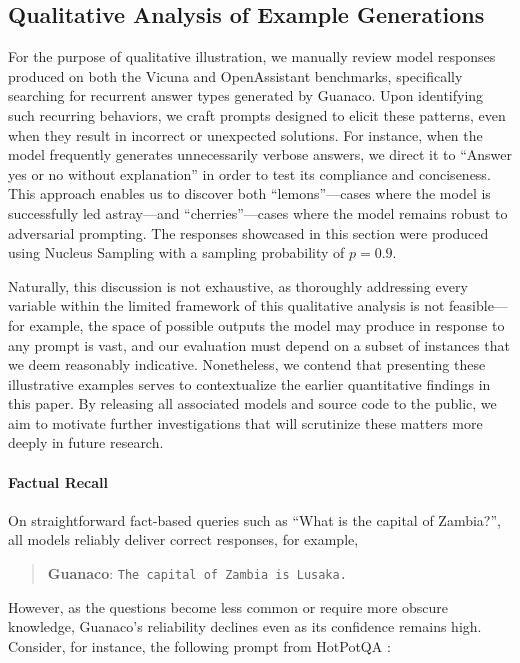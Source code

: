 \subsection{Qualitative Analysis of Example Generations}
\label{ssec:examples}

For the purpose of qualitative illustration, we manually review model responses produced on both the Vicuna and OpenAssistant benchmarks, specifically searching for recurrent answer types generated by {Guanaco}. Upon identifying such recurring behaviors, we craft prompts designed to elicit these patterns, even when they result in incorrect or unexpected solutions. For instance, when the model frequently generates unnecessarily verbose answers, we direct it to ``Answer yes or no without explanation'' in order to test its compliance and conciseness. This approach enables us to discover both ``lemons''—cases where the model is successfully led astray—and ``cherries''—cases where the model remains robust to adversarial prompting. The responses showcased in this section were produced using Nucleus Sampling \cite{holtzmancurious} with a sampling probability of $p=0.9$.

Naturally, this discussion is not exhaustive, as thoroughly addressing every variable within the limited framework of this qualitative analysis is not feasible—for example, the space of possible outputs the model may produce in response to any prompt is vast, and our evaluation must depend on a subset of instances that we deem reasonably indicative. Nonetheless, we contend that presenting these illustrative examples serves to contextualize the earlier quantitative findings in this paper. By releasing all associated models and source code to the public, we aim to motivate further investigations that will scrutinize these matters more deeply in future research.
\paragraph{Factual Recall} On straightforward fact-based queries such as ``What is the capital of Zambia?'', all models reliably deliver correct responses, for example,

\begin{quote} 
    \textbf{Guanaco}:
    \texttt{The capital of Zambia is Lusaka.}
\end{quote}

However, as the questions become less common or require more obscure knowledge, {Guanaco}’s reliability declines even as its confidence remains high. Consider, for instance, the following prompt from HotPotQA \citep{yang2018hotpotqa}:

